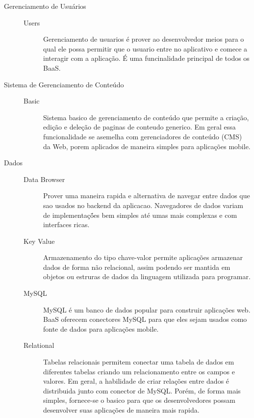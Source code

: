 	\begin{description}
		\item[Gerenciamento de Usuários]
			\begin{description}
            	\item[]
				\item[Users]{Gerenciamento de usuarios é prover ao  desenvolvedor meios para o qual ele possa permitir que o usuario entre no aplicativo e comece a interagir com a aplicação. É uma funcinalidade principal de todos os BaaS.}
			\end{description}
		
		\item[Sistema de Gerenciamento de Conteúdo]
			\begin{description}
            	\item[]
				\item[Basic]{Sistema basico de gerenciamento de conteúdo que permite a criação, edição e deleção de paginas de conteudo generico. Em geral essa funcionalidade se asemelha com gerenciadores de conteúdo (CMS) da Web, porem aplicados de maneira simples para aplicações mobile.}
			\end{description}
		
		\item[Dados]
			\begin{description}
            	\item[]
				\item[Data Browser] { Prover uma maneira rapida e alternativa de navegar entre dados que sao usados no backend da aplicacao. Navegadores de dados variam de implementaçṍes bem simples até umas mais complexas e com interfaces ricas.}
				
				\item[Key Value] {Armazenamento do tipo chave-valor permite aplicações armazenar dados de forma não relacional, assim podendo ser mantida em objetos ou estruras de dados da linguagem utilizada para programar.}
				
				\item[MySQL] {MySQL é um banco de dados popular para construir aplicações web.  BaaS oferecem conectores MySQL para que eles sejam usados como fonte de dados para aplicações mobile.}
				
				\item[Relational] { Tabelas relacionais permitem conectar uma tabela de dados em diferentes tabelas criando um relacionamento entre os campos e valores. Em geral, a habilidade de criar relações entre dados é distribuida junto com conector de MySQL. Porém, de forma mais simples, fornece-se o basico para que os desenvolvedores possam desenvolver suas aplicações de maneira mais rapida.}


\end{description}
\end{description}
